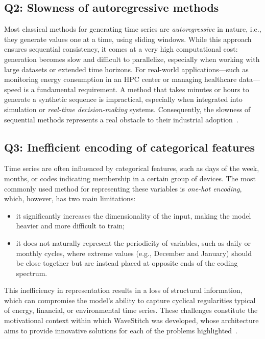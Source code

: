 \subsection{Q2: Slowness of autoregressive methods}
Most classical methods for generating time series are \emph{autoregressive} in nature, i.e., they generate values one at a time, using sliding windows.  
While this approach ensures sequential consistency, it comes at a very high computational cost: generation becomes slow and difficult to parallelize, especially when working with large datasets or extended time horizons.  
For real-world applications—such as monitoring energy consumption in an HPC center or managing healthcare data—speed is a fundamental requirement.  
A method that takes minutes or hours to generate a synthetic sequence is impractical, especially when integrated into simulation or \emph{real-time decision-making} systems.  
Consequently, the slowness of sequential methods represents a real obstacle to their industrial adoption~\cite{yoon2019timegan,zhou2023timeweaver}.

\subsection{Q3: Inefficient encoding of categorical features}
Time series are often influenced by categorical features, such as days of the week, months, or codes indicating membership in a certain group of devices.  
The most commonly used method for representing these variables is \emph{one-hot encoding}, which, however, has two main limitations:
\begin{itemize}
    \item it significantly increases the dimensionality of the input, making the model heavier and more difficult to train;
    \item it does not naturally represent the periodicity of variables, such as daily or monthly cycles, where extreme values (e.g., December and January) should be close together but are instead placed at opposite ends of the coding spectrum.
\end{itemize}
This inefficiency in representation results in a loss of structural information, which can compromise the model’s ability to capture cyclical regularities typical of energy, financial, or environmental time series.  
These challenges constitute the motivational context within which WaveStitch was developed, whose architecture aims to provide innovative solutions for each of the problems highlighted~\cite{wavestitch}.


